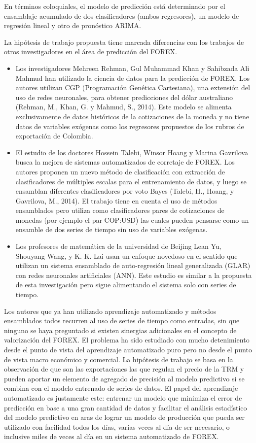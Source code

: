 En términos coloquiales, el modelo de predicción está determinado por el ensamblaje acumulado de dos clasificadores (ambos regresores), un modelo de regresión lineal y otro de pronóstico ARIMA.

La hipótesis de trabajo propuesta tiene marcada diferencias con los trabajos de otros investigadores en el área de predicción del FOREX.

\begin{itemize}
\item Los investigadores Mehreen Rehman, Gul Muhammad Khan y Sahibzada Ali Mahmud han utilizado la ciencia de datos para la predicción de FOREX. Los autores utilizan CGP (Programación Genética Cartesiana), una extensión del uso de redes neuronales, para obtener predicciones del dólar australiano (Rehman, M., Khan, G. y Mahmud, S., 2014). Este modelo se alimenta exclusivamente de datos históricos de la cotizaciones de la moneda y no tiene datos de variables exógenas como los regresores propuestos de los rubros de exportación de Colombia.
\item El estudio de los doctores Hossein Talebi, Winsor Hoang y Marina Gavrilova busca la mejora de sistemas automatizados de corretaje de FOREX. Los autores proponen un nuevo método de clasificación con extracción de clasificadores de múltiples escalas para el entrenamiento de datos, y luego se ensamblan diferentes clasificadores por voto Bayes (Talebi, H., Hoang, y Gavrilova, M., 2014). El trabajo tiene en cuenta el uso de métodos ensamblados pero utiliza como clasificadores pares de cotizaciones de monedas (por ejemplo el par COP:USD) las cuales pueden pensarse como un ensamble de dos series de tiempo sin uso de variables exógenas.
\item Los profesores de matemática de la universidad de Beijing Lean Yu, Shouyang Wang, y K. K. Lai usan un enfoque novedoso en el sentido que utilizan un sistema ensamblado de auto-regresión lineal generalizada (GLAR) con redes neuronales artificiales (ANN). Este estudio es similar a la propuesta de esta investigación pero sigue alimentando el sistema solo con series de tiempo.
\end{itemize}

Los autores que ya han utilizado aprendizaje automatizado y métodos ensamblados todos recurren al uso de series de tiempo como entradas, sin que ninguno se haya preguntado si existen sinergias adicionales en el concepto de valorización del FOREX. El problema ha sido estudiado con mucho detenimiento desde el punto de vista del aprendizaje automatizado puro pero no desde el punto de vista macro económico y comercial. La hipótesis de trabajo se basa en la observación de que son las exportaciones las que regulan el precio de la TRM y pueden aportar un elemento de agregado de precisión al modelo predictivo si se combina con el modelo entrenado de series de datos. El papel del aprendizaje automatizado es justamente este: entrenar un modelo que minimiza el error de predicción en base a una gran cantidad de datos y facilitar el análisis estadístico del modelo predictivo en aras de lograr un modelo de producción que pueda ser utilizado con facilidad todos los días, varias veces al día de ser necesario, o inclusive miles de veces al día en un sistema automatizado de FOREX.
